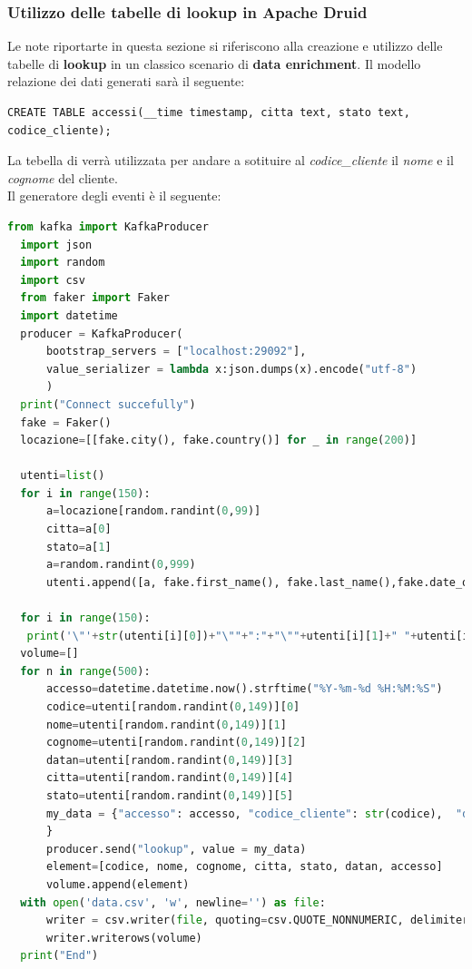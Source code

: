 \documentclass{article}
\begin{document}
\subsubsection{Utilizzo delle tabelle di lookup in Apache Druid}
Le note riportarte in questa sezione si riferiscono alla creazione e utilizzo delle tabelle di \textbf{lookup} in un classico scenario di \textbf{data enrichment}.
Il modello relazione dei dati generati sarà il seguente: 
\begin{lstlisting}
CREATE TABLE accessi(__time timestamp, citta text, stato text, codice_cliente);
\end{lstlisting}
La tebella di verrà utilizzata per andare a sotituire al \textit{codice\_cliente} il \textit{nome} e il \textit{cognome} del cliente.\\
Il generatore degli eventi è il seguente:
\begin{lstlisting}[language=Python]
  from kafka import KafkaProducer  
  import json 
  import random
  import csv
  from faker import Faker
  import datetime
  producer = KafkaProducer(  
      bootstrap_servers = ["localhost:29092"],  
      value_serializer = lambda x:json.dumps(x).encode("utf-8")  
      )  
  print("Connect succefully") 
  fake = Faker()
  locazione=[[fake.city(), fake.country()] for _ in range(200)]
  
  utenti=list()
  for i in range(150):
      a=locazione[random.randint(0,99)]
      citta=a[0]
      stato=a[1]
      a=random.randint(0,999)
      utenti.append([a, fake.first_name(), fake.last_name(),fake.date_of_birth(minimum_age=18, maximum_age=89).strftime("%Y-%m-%d"), citta, stato] )
  
  for i in range(150):
   print('\"'+str(utenti[i][0])+"\""+":"+"\""+utenti[i][1]+" "+utenti[i][2]+"\"")
  volume=[]
  for n in range(500):
      accesso=datetime.datetime.now().strftime("%Y-%m-%d %H:%M:%S")
      codice=utenti[random.randint(0,149)][0]
      nome=utenti[random.randint(0,149)][1]
      cognome=utenti[random.randint(0,149)][2]
      datan=utenti[random.randint(0,149)][3]
      citta=utenti[random.randint(0,149)][4]
      stato=utenti[random.randint(0,149)][5]
      my_data = {"accesso": accesso, "codice_cliente": str(codice),  "datan":  datan, "citta": citta, "stato": stato,
      }
      producer.send("lookup", value = my_data) 
      element=[codice, nome, cognome, citta, stato, datan, accesso]
      volume.append(element)
  with open('data.csv', 'w', newline='') as file:
      writer = csv.writer(file, quoting=csv.QUOTE_NONNUMERIC, delimiter=',')
      writer.writerows(volume) 
  print("End")
\end{lstlisting}
\end{document}
